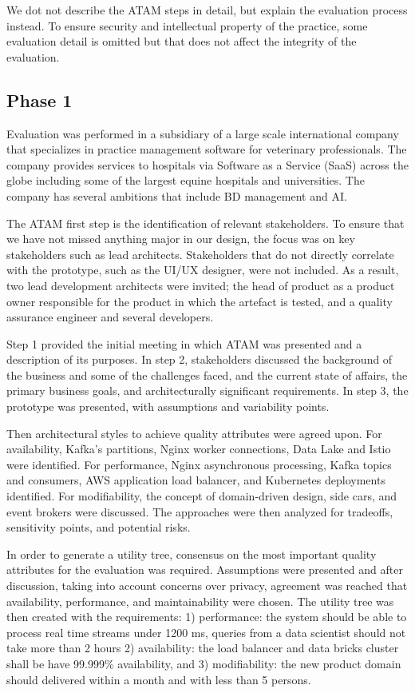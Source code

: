 \documentclass[a4paper,11pt]{article}
\begin{document}
We dot not describe the ATAM steps in detail, but explain the evaluation process instead. To ensure security and intellectual property of the practice, some evaluation detail is omitted but that does not affect the integrity of the evaluation.  

\subsection{Phase 1}
\nobreak{}
Evaluation was performed in a subsidiary of a large scale international company that specializes in practice management software for veterinary professionals. The company provides services to hospitals via Software as a Service (SaaS) across the globe including some of the largest equine hospitals and universities. The company has several ambitions that include BD management and AI. 

The ATAM first step is the identification of relevant stakeholders. To ensure that we have not missed anything major in our design, the focus was on key stakeholders such as lead architects. Stakeholders that do not directly correlate with the prototype, such as the UI/UX designer, were not included. As a result, two lead development architects were invited; the head of product as a product owner responsible for the product in which the artefact is tested, and a quality assurance engineer and several developers. 

Step 1 provided the initial meeting in which ATAM was presented and a description of its purposes. In step 2, stakeholders discussed the background of the business and some of the challenges faced, and the current state of affairs, the primary business goals, and architecturally significant requirements. In step 3, the prototype was presented, with assumptions and variability points. 

Then architectural styles to achieve quality attributes were agreed upon. For availability, Kafka's partitions, Nginx worker connections, Data Lake and Istio were identified.  For performance, Nginx asynchronous processing, Kafka topics and consumers, AWS application load balancer, and Kubernetes deployments identified. For modifiability, the concept of domain-driven design, side cars, and event brokers were discussed. The approaches were then analyzed for tradeoffs, sensitivity points, and potential risks. 

In order to generate a utility tree, consensus on the most important quality attributes for the evaluation was required. Assumptions were presented and after discussion, taking into account concerns over privacy, agreement was reached that availability, performance, and maintainability were chosen. The utility tree was then created with the requirements: 1) performance: the system should be able to process real time streams under 1200 ms, queries from a data scientist should not take more than 2 hours 2) availability: the load balancer and data bricks cluster shall be have 99.999\% availability, and 3) modifiability: the new product domain should delivered within a month and with less than 5 persons.
\end{document}
